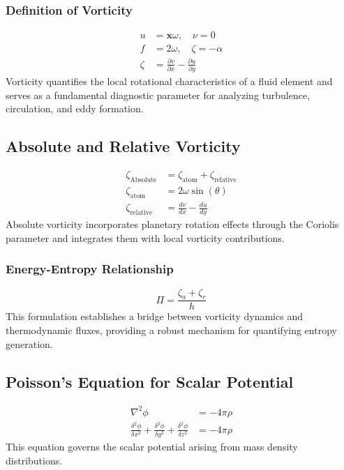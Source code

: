 \documentclass[a4paper,12pt]{article}
\begin{document}
    \subsubsection*{Definition of Vorticity}
    \begin{align}
        u &= \boldsymbol{x} \omega, \quad \nu=0 \\
        f &= 2 \omega, \quad \zeta=-\alpha \\
        \zeta &= \frac{\partial v}{\partial x} - \frac{\partial u}{\partial y}
    \end{align}
    Vorticity quantifies the local rotational characteristics of a fluid element and serves as a fundamental diagnostic parameter for analyzing turbulence, circulation, and eddy formation.

    \subsection{Absolute and Relative Vorticity}
    \begin{align}
        \zeta_\text{Absolute} &= \zeta_\text{atom} + \zeta_\text{relative} \\
        \zeta_\text{atom} &= 2 \omega \sin(\theta) \\
        \zeta_{\text {relative }} &=\frac{d v}{d x}-\frac{d u}{d y}
    \end{align}
    Absolute vorticity incorporates planetary rotation effects through the Coriolis parameter and integrates them with local vorticity contributions.

    \subsubsection*{Energy-Entropy Relationship}
    \begin{equation*}
        \Pi = \frac{\zeta_a + \zeta_r}{h}
    \end{equation*}
    This formulation establishes a bridge between vorticity dynamics and thermodynamic fluxes, providing a robust mechanism for quantifying entropy generation.

    \subsection{Poisson's Equation for Scalar Potential}
    \begin{align}
        \nabla^2 \phi &= -4 \pi \rho \\
        \frac{\delta^2 \phi}{\delta x^2}+\frac{\delta^2 \phi}{\delta y^2}+\frac{\delta^2 \phi}{\delta z^2} &= -4 \pi \rho
    \end{align}
    This equation governs the scalar potential arising from mass density distributions.
\end{document}

